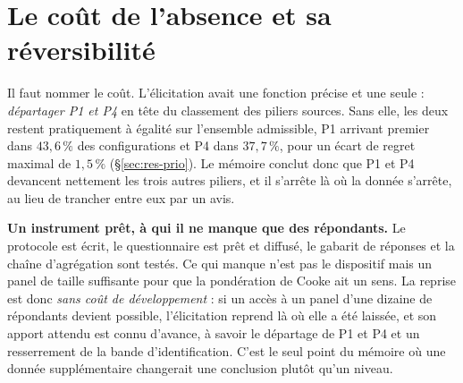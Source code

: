 \section{Le coût de l'absence et sa réversibilité}

Il faut nommer le coût. L'élicitation avait une fonction précise et une seule :
\emph{départager P1 et P4} en tête du classement des piliers sources. Sans elle, les deux
restent pratiquement à égalité sur l'ensemble admissible, P1 arrivant premier dans
$43{,}6\,\%$ des configurations et P4 dans $37{,}7\,\%$, pour un écart de regret maximal de
$1{,}5\,\%$ (\S\ref{sec:res-prio}). Le mémoire conclut donc que P1 et P4 devancent nettement les
trois autres piliers, et il s'arrête là où la donnée s'arrête, au lieu de trancher entre eux par
un avis.

\begin{cle}
\textbf{Un instrument prêt, à qui il ne manque que des répondants.} Le protocole est écrit, le
questionnaire est prêt et diffusé, le gabarit de réponses et la chaîne d'agrégation sont testés.
Ce qui manque n'est pas le dispositif mais un panel de taille suffisante pour que la pondération
de Cooke ait un sens. La reprise est donc \emph{sans coût de développement} : si un accès à un panel
d'une dizaine de répondants devient possible, l'élicitation reprend là où elle a été laissée,
et son apport attendu est connu d'avance, à savoir le départage de P1 et P4 et un resserrement
de la bande d'identification. C'est le seul point du mémoire où une donnée supplémentaire
changerait une conclusion plutôt qu'un niveau.
\end{cle}
